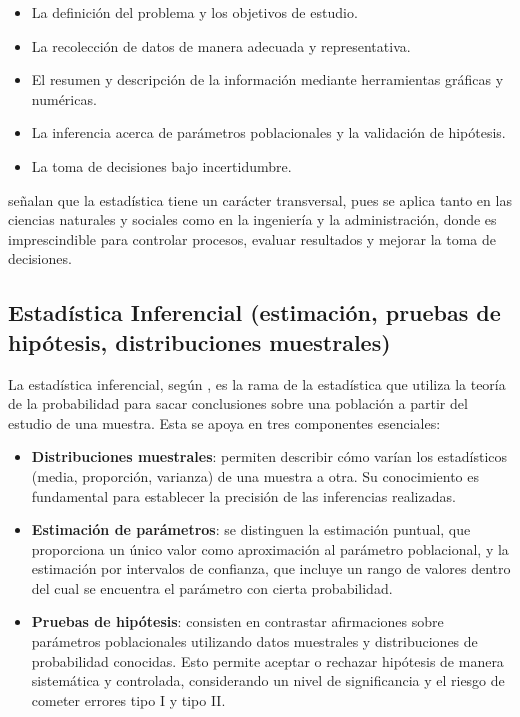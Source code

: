 \documentclass[letter,oneside,12pt,spanish]{report}
\begin{document}
\begin{itemize}
	\item La definición del problema y los objetivos de estudio.
	\item La recolección de datos de manera adecuada y representativa.
	\item El resumen y descripción de la información mediante herramientas gráficas y numéricas.
	\item La inferencia acerca de parámetros poblacionales y la validación de hipótesis.
	\item La toma de decisiones bajo incertidumbre.
\end{itemize}

\textcite{montgomery1996} señalan que la estadística tiene un carácter transversal, pues se aplica tanto en las ciencias naturales y sociales como en la ingeniería y la administración, donde es imprescindible para controlar procesos, evaluar resultados y mejorar la toma de decisiones.

\subsection{Estadística Inferencial (estimación, pruebas de hipótesis, distribuciones muestrales)}

La estadística inferencial, según \textcite{montgomery1996}, es la rama de la estadística que utiliza la teoría de la probabilidad para sacar conclusiones sobre una población a partir del estudio de una muestra. Esta se apoya en tres componentes esenciales:

\begin{itemize}
	\item \textbf{Distribuciones muestrales}: permiten describir cómo varían los estadísticos (media, proporción, varianza) de una muestra a otra. Su conocimiento es fundamental para establecer la precisión de las inferencias realizadas.
	
	\item \textbf{Estimación de parámetros}: se distinguen la estimación puntual, que proporciona un único valor como aproximación al parámetro poblacional, y la estimación por intervalos de confianza, que incluye un rango de valores dentro del cual se encuentra el parámetro con cierta probabilidad.
	
	\item \textbf{Pruebas de hipótesis}: consisten en contrastar afirmaciones sobre parámetros poblacionales utilizando datos muestrales y distribuciones de probabilidad conocidas. Esto permite aceptar o rechazar hipótesis de manera sistemática y controlada, considerando un nivel de significancia y el riesgo de cometer errores tipo I y tipo II.
\end{itemize}
\end{document}
